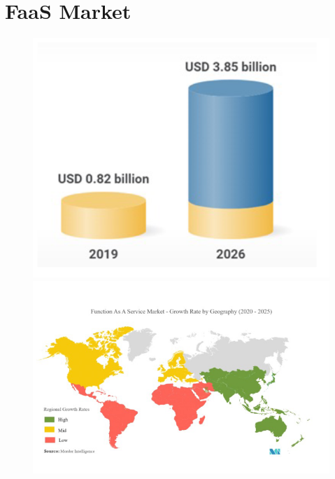 \documentclass[a4paper, 12pt]{report}
\begin{document}
            \section{FaaS Market}
            \begin{figure}[htbp]
              \centering
              \includegraphics[scale=0.5]{Immagini/FaasMarket.png}
              \includegraphics[scale=0.5]{Immagini/FaasMarket2.png}
            \end{figure} 
\end{document}

